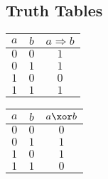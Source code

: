 \subsection{Truth Tables}
\begin{table}[H]
    \parbox{.40\linewidth}{
        \centering
        \begin{tabular}{|c|c|c|}
            \hline
            \cellcolor{gray!40} $a$ & \cellcolor{gray!40} $b$ & \cellcolor{gray!40} $a \Rightarrow b$ \\
            \hline
            $0$ & $0$ & $1$ \\
            \hline
            $0$ & $1$ & $1$ \\
            \hline
            $1$ & $0$ & $0$ \\
            \hline
            $1$ & $1$ & $1$ \\
            \hline
        \end{tabular}
    }
    \parbox{.40\linewidth}{
        \centering
        \begin{tabular}{|c|c|c|}
            \hline
            \cellcolor{gray!40} $a$ & \cellcolor{gray!40} $b$ & \cellcolor{gray!40} $a \xor b$ \\
            \hline
            $0$ & $0$ & $0$ \\
            \hline
            $0$ & $1$ & $1$ \\
            \hline
            $1$ & $0$ & $1$ \\
            \hline
            $1$ & $1$ & $0$ \\
            \hline
        \end{tabular}
    }
\end{table}